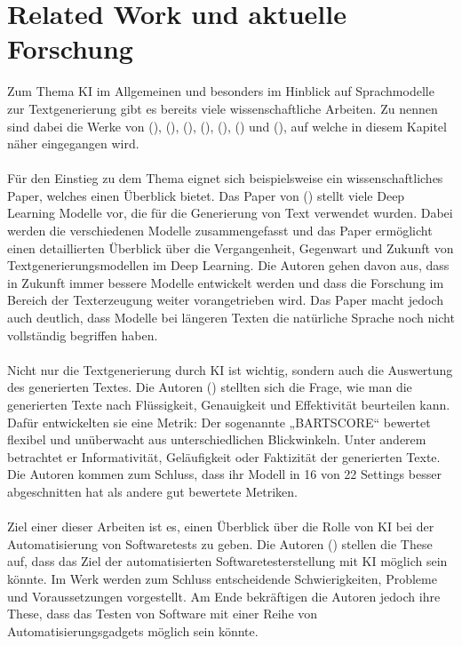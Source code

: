 \documentclass[12pt,toc=bib,toc=listof]{scrreprt}
\begin{document}
\chapter{Related Work und aktuelle Forschung} %
\label{sec:relatedWorkUndAktuelleForschung}
Zum Thema KI im Allgemeinen und besonders im Hinblick auf Sprachmodelle zur Textgenerierung gibt es bereits viele wissenschaftliche Arbeiten. Zu nennen sind dabei die Werke von (\cite{Iqbal2022}), (\cite{Yuan2021}), (\cite{Khan2024}), (\cite{Bhandari2024}), (\cite{Gu2024}), (\cite{Chen2024}) und (\cite{Wang2024}), auf welche in diesem Kapitel näher eingegangen wird.\\
\\
Für den Einstieg zu dem Thema eignet sich beispielsweise ein wissenschaftliches Paper, welches einen Überblick bietet. Das Paper von (\cite{Iqbal2022}) stellt viele Deep Learning Modelle vor, die für die Generierung von Text verwendet wurden. Dabei werden die verschiedenen Modelle zusammengefasst und das Paper ermöglicht einen detaillierten Überblick über die Vergangenheit, Gegenwart und Zukunft von Textgenerierungsmodellen im Deep Learning. Die Autoren gehen davon aus, dass in Zukunft immer bessere Modelle entwickelt werden und dass die Forschung im Bereich der Texterzeugung weiter vorangetrieben wird. Das Paper macht jedoch auch deutlich, dass Modelle bei längeren Texten die natürliche Sprache noch nicht vollständig begriffen haben.\\
\\
Nicht nur die Textgenerierung durch KI ist wichtig, sondern auch die Auswertung des generierten Textes. Die Autoren (\cite{Yuan2021}) stellten sich die Frage, wie man die generierten Texte nach Flüssigkeit, Genauigkeit und Effektivität beurteilen kann. Dafür entwickelten sie eine Metrik: Der sogenannte „BARTSCORE“ bewertet flexibel und unüberwacht aus unterschiedlichen Blickwinkeln. Unter anderem betrachtet er Informativität, Geläufigkeit oder Faktizität der generierten Texte. Die Autoren kommen zum Schluss, dass ihr Modell in 16 von 22 Settings besser abgeschnitten hat als andere gut bewertete Metriken.\\
\\
Ziel einer dieser Arbeiten ist es, einen Überblick über die Rolle von KI bei der Automatisierung von Softwaretests zu geben. Die Autoren (\cite{Khan2024}) stellen die These auf, dass das Ziel der automatisierten Softwaretesterstellung mit KI möglich sein könnte. Im Werk werden zum Schluss entscheidende Schwierigkeiten, Probleme und Voraussetzungen vorgestellt. Am Ende bekräftigen die Autoren jedoch ihre These, dass das Testen von Software mit einer Reihe von Automatisierungsgadgets möglich sein könnte.\\
\end{document}
